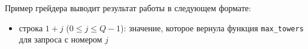 


Пример грейдера выводит результат работы в следующем формате:

\begin{itemize}
    \item строка $1 + j$ ($0 \le j \le Q - 1$): значение, которое вернула функция \texttt{max\_towers} для запроса с номером $j$
\end{itemize} 
